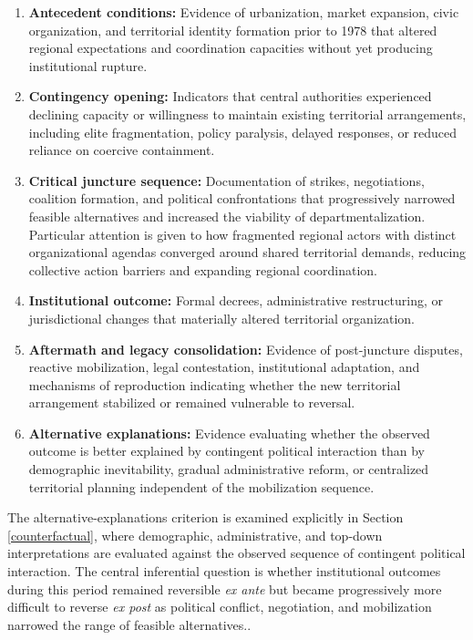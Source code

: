 \documentclass[12pt]{article}
\begin{document}
\begin{enumerate}[leftmargin=*, nosep]

    \item \textbf{Antecedent conditions:} Evidence of urbanization, market expansion, civic organization, and territorial identity formation prior to 1978 that altered regional expectations and coordination capacities without yet producing institutional rupture.
    
    \item \textbf{Contingency opening:} Indicators that central authorities experienced declining capacity or willingness to maintain existing territorial arrangements, including elite fragmentation, policy paralysis, delayed responses, or reduced reliance on coercive containment.
    
    \item \textbf{Critical juncture sequence:} Documentation of strikes, negotiations, coalition formation, and political confrontations that progressively narrowed feasible alternatives and increased the viability of departmentalization. Particular attention is given to how fragmented regional actors with distinct organizational agendas converged around shared territorial demands, reducing collective action barriers and expanding regional coordination.
    
    \item \textbf{Institutional outcome:} Formal decrees, administrative restructuring, or jurisdictional changes that materially altered territorial organization.
    
    \item \textbf{Aftermath and legacy consolidation:} Evidence of post-juncture disputes, reactive mobilization, legal contestation, institutional adaptation, and mechanisms of reproduction indicating whether the new territorial arrangement stabilized or remained vulnerable to reversal.
    
    \item \textbf{Alternative explanations:} Evidence evaluating whether the observed outcome is better explained by contingent political interaction than by demographic inevitability, gradual administrative reform, or centralized territorial planning independent of the mobilization sequence.

\end{enumerate}

The alternative-explanations criterion is examined explicitly in Section \ref{counterfactual}, where demographic, administrative, and top-down interpretations are evaluated against the observed sequence of contingent political interaction. The central inferential question is whether institutional outcomes during this period remained reversible \textit{ex ante} but became progressively more difficult to reverse \textit{ex post} as political conflict, negotiation, and mobilization narrowed the range of feasible alternatives..
\end{document}
